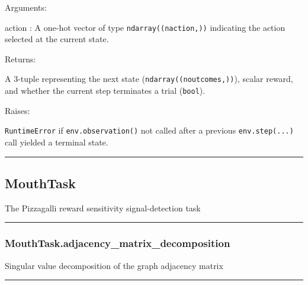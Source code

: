 Arguments:

action : A one-hot vector of type \texttt{ndarray((naction,))}
indicating the action selected at the current state.

Returns:

A 3-tuple representing the next state (\texttt{ndarray((noutcomes,))}),
scalar reward, and whether the current step terminates a trial
(\texttt{bool}).

Raises:

\texttt{RuntimeError} if \texttt{env.observation()} not called after a
previous \texttt{env.step(...)} call yielded a terminal state.

\begin{center}\rule{0.5\linewidth}{\linethickness}\end{center}

\subsection{MouthTask}\label{mouthtask}

\begin{Shaded}
\begin{Highlighting}[]
\end{Highlighting}
\end{Shaded}

The Pizzagalli reward sensitivity signal-detection task

\begin{center}\rule{0.5\linewidth}{\linethickness}\end{center}

\subsubsection{MouthTask.adjacency\_matrix\_decomposition}\label{mouthtask.adjacency_matrix_decomposition}

\begin{Shaded}
\begin{Highlighting}[]
\NormalTok{)}
\end{Highlighting}
\end{Shaded}

Singular value decomposition of the graph adjacency matrix

\begin{center}\rule{0.5\linewidth}{\linethickness}\end{center}

